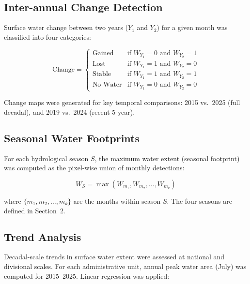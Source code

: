 \documentclass[fleqn,10pt]{article}
\begin{document}
\subsection{Inter-annual Change Detection}

Surface water change between two years ($Y_1$ and $Y_2$) for a given month was classified into four categories:

\begin{equation}
\text{Change} =
\begin{cases}
\text{Gained}   & \text{if } W_{Y_1} = 0 \text{ and } W_{Y_2} = 1 \\
\text{Lost}     & \text{if } W_{Y_1} = 1 \text{ and } W_{Y_2} = 0 \\
\text{Stable}   & \text{if } W_{Y_1} = 1 \text{ and } W_{Y_2} = 1 \\
\text{No Water} & \text{if } W_{Y_1} = 0 \text{ and } W_{Y_2} = 0
\end{cases}
\label{eq:change}
\end{equation}

Change maps were generated for key temporal comparisons: 2015 vs.\ 2025 (full decadal), and 2019 vs.\ 2024 (recent 5-year).

\subsection{Seasonal Water Footprints}

For each hydrological season $S$, the maximum water extent (seasonal footprint) was computed as the pixel-wise union of monthly detections:

\begin{equation}
W_{S} = \max(W_{m_1}, W_{m_2}, \ldots, W_{m_k})
\label{eq:seasonal}
\end{equation}

where $\{m_1, m_2, \ldots, m_k\}$ are the months within season $S$. The four seasons are defined in Section~2.

\subsection{Trend Analysis}

Decadal-scale trends in surface water extent were assessed at national and divisional scales. For each administrative unit, annual peak water area (July) was computed for 2015--2025. Linear regression was applied:
\end{document}

